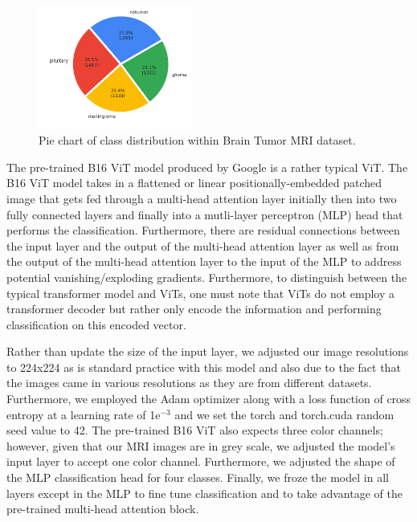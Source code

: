 \documentclass[conference]{IEEEtran}
\begin{document}
\begin{figure}[h]
    \centering
    \includegraphics[width=0.45\textwidth]{class distribution.PNG}
    \caption{Pie chart of class distribution within Brain Tumor MRI dataset.}
    \label{fig:piechart}
\end{figure}

The pre-trained B16 ViT model produced by Google is a rather typical ViT. The B16 ViT model takes in a flattened or linear positionally-embedded patched image that gets fed through a multi-head attention layer initially then into two fully connected layers and finally into a mutli-layer perceptron (MLP) head that performs the classification. Furthermore, there are residual connections between the input layer and the output of the multi-head attention layer as well as from the output of the multi-head attention layer to the input of the MLP to address potential vanishing/exploding gradients. Furthermore, to distinguish between the typical transformer model and ViTs, one must note that ViTs do not employ a transformer decoder but rather only encode the information and performing classification on this encoded vector.

Rather than update the size of the input layer, we adjusted our image resolutions to 224x224 as is standard practice with this model and also due to the fact that the images came in various resolutions as they are from different datasets. Furthermore, we employed the Adam optimizer along with a loss function of cross entropy at a learning rate of 1e$^{-3}$ and we set the torch and torch.cuda random seed value to 42. The pre-trained B16 ViT also expects three color channels; however, given that our MRI images are in grey scale, we adjusted the model's input layer to accept one color channel. Furthermore, we adjusted the shape of the MLP classification head for four classes. Finally, we froze the model in all layers except in the MLP to fine tune classification and to take advantage of the pre-trained multi-head attention block.
\end{document}
